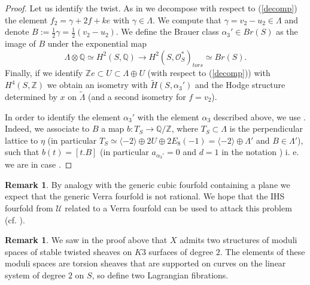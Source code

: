 \documentclass[a4paper,11pt]{amsart}
\theoremstyle{definition}
\newtheorem{rem}[thm]{Remark}
\numberwithin{equation}{section}
\numberwithin{equation}{section} \theoremstyle{definition}
\begin{document}
\begin{proof}
Let us identify the twist. As in \cite[Lemma~2.6]{Huy} we decompose with respect to (\ref{decomp})  the element $f_2=\gamma+2f+ke$ with $\gamma \in \Lambda$.
We compute that $\gamma=v_2-u_2 \in \Lambda$ and denote $B:=\frac{1}{2} \gamma=\frac{1}{2}(v_2-u_2)$. We define the Brauer class $\alpha_3' \in Br(S)$ as the image of
$B$ under the exponential map $$\Lambda\otimes {{\mathbb{Q}}}\simeq H^2(S,{{\mathbb{Q}}}) \to H^2(S,\mathcal{O}^*_S)_{tors}\simeq Br(S).$$ Finally, if we identify ${\mathbb{Z}} e\subset U\subset \Lambda\oplus U$ 
(with respect to (\ref{decomp})) 
with $H^4(S,{\mathbb{Z}})$ we obtain an isometry with $\tilde{H}(S,\alpha_3')$ and the Hodge structure determined by $x$ on $\tilde{\Lambda}$ (and a second isometry for $ f=v_2$).

In order to identify the element $\alpha_3'$ with the element $\alpha_3$ described above, we use \cite[\S 2.1]{vG}.
Indeed, we associate to $B$ a map $b \colon T_S\to {{\mathbb{Q}}}/{\mathbb{Z}}$, where $T_S\subset \Lambda$ is the perpendicular lattice to $\eta$ (in particular $T_S\simeq \langle-2\rangle \oplus 2 U \oplus 2 E_8(-1)=\langle-2\rangle\oplus \Lambda'$ and $B\in \Lambda'$), such that $b(t)=[t.B]$ (in particular $a_{\alpha_3'}=0$ and $d=1$ in the notation \cite[Proposition~9.2]{vG}) i. e. we are in case \cite[Proposition~9.8]{vG}.
\end{proof}
\begin{rem} By analogy with the generic cubic fourfold containing a plane we expect that the generic Verra fourfold is not rational. We hope that the IHS fourfold from $\mathcal{U}$ related to a Verra fourfold can be used to attack this problem (cf. \cite{MS}). 
\end{rem}
\begin{rem} We saw in the proof above that $X$ admits two structures of moduli spaces of stable twisted sheaves on $K3$ surfaces of degree $2$.
The elements of these moduli spaces are torsion sheaves that are supported on curves on the linear system of degree $2$ on $S$, so define two Lagrangian fibrations.
\end{rem}
 
\end{document}
